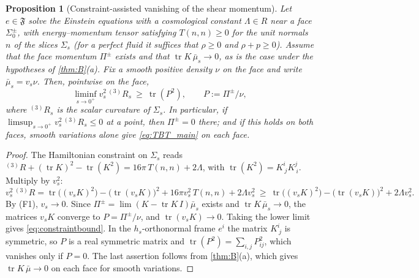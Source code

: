 \documentclass[11pt]{article}
\theoremstyle{canonmath}
\theoremstyle{canonpostulate}
\theoremstyle{canonproposition}
\theoremstyle{canonmath}
\newtheorem{proposition*}[theorem]{Proposition}
\theoremstyle{canonproposition}
\providecommand{\Fcl}{\mathfrak{F}}
\providecommand{\R}{\mathbb{R}}
\def\mathbb#1{#1}%
\begin{document}
\begin{proposition*}[Constraint-assisted vanishing of the shear momentum]\label{prop:constraint}
Let $e\in\Fcl$ solve the Einstein equations with a cosmological constant $\Lambda\in\R$ near a face $\Sigma_0^\pm$, with energy--momentum tensor satisfying $T(n,n)\ge0$ for the unit normals $n$ of the slices $\Sigma_s$ (for a perfect fluid it suffices that $\rho\ge0$ and $\rho+p\ge0$). Assume that the face momentum $\Pi^\pm$ exists and that $\operatorname{tr}K\,\bar\mu_s\to0$, as is the case under the hypotheses of \cref{thm:B}(a). Fix a smooth positive density $\nu$ on the face and write $\bar\mu_s = v_s\nu$. Then, pointwise on the face,
\begin{equation}
\liminf_{s\to0^+}v_s^2\,{}^{(3)}\!R_s\ \ge\ \operatorname{tr}(P^2), \qquad P := \Pi^\pm/\nu,
\label{eq:constraintbound}
\end{equation}
where ${}^{(3)}\!R_s$ is the scalar curvature of $\Sigma_s$. In particular, if $\limsup_{s\to0^+}v_s^2\,{}^{(3)}\!R_s\le0$ at a point, then $\Pi^\pm = 0$ there; and if this holds on both faces, smooth variations alone give \eqref{eq:TBT_main} on each face.
\end{proposition*}

\begin{proof}
The Hamiltonian constraint on $\Sigma_s$ reads ${}^{(3)}\!R + (\operatorname{tr}K)^2 - \operatorname{tr}(K^2) = 16\pi\,T(n,n) + 2\Lambda$, with $\operatorname{tr}(K^2) = K^i_{\ j}K^j_{\ i}$. Multiply by $v_s^2$:
\[
v_s^2\,{}^{(3)}\!R = \operatorname{tr}\bigl((v_sK)^2\bigr) - \bigl(\operatorname{tr}(v_sK)\bigr)^2 + 16\pi v_s^2\,T(n,n) + 2\Lambda v_s^2 \ \ge\ \operatorname{tr}\bigl((v_sK)^2\bigr) - \bigl(\operatorname{tr}(v_sK)\bigr)^2 + 2\Lambda v_s^2.
\]
By (F1), $v_s\to0$. Since $\Pi^\pm = \lim(K - \operatorname{tr}K\,I)\bar\mu_s$ exists and $\operatorname{tr}K\,\bar\mu_s\to0$, the matrices $v_sK$ converge to $P = \Pi^\pm/\nu$, and $\operatorname{tr}(v_sK)\to0$. Taking the lower limit gives \eqref{eq:constraintbound}. In the $h_s$-orthonormal frame $e^i$ the matrix $K^i_{\ j}$ is symmetric, so $P$ is a real symmetric matrix and $\operatorname{tr}(P^2) = \sum_{i,j}P_{ij}^2$, which vanishes only if $P = 0$. The last assertion follows from \cref{thm:B}(a), which gives $\operatorname{tr}K\,\bar\mu\to0$ on each face for smooth variations.
\end{proof}
\end{document}
